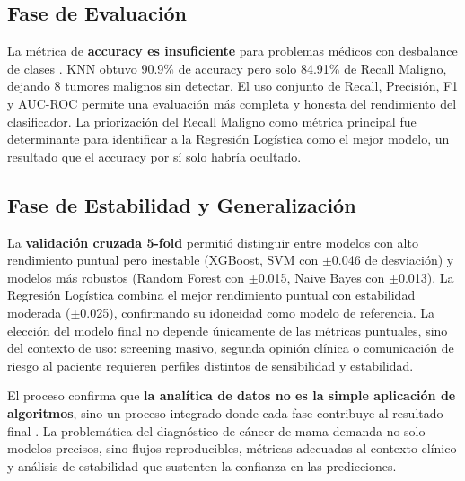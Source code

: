 \documentclass[journal]{IEEEtran}
\begin{document}
\subsection{Fase de Evaluación}
La métrica de \textbf{accuracy es insuficiente} para problemas médicos con desbalance de clases \cite{hossin2015, sokolova2009}. KNN obtuvo 90.9\% de accuracy pero solo 84.91\% de Recall Maligno, dejando 8 tumores malignos sin detectar. El uso conjunto de Recall, Precisión, F1 y AUC-ROC permite una evaluación más completa y honesta del rendimiento del clasificador. La priorización del Recall Maligno como métrica principal fue determinante para identificar a la Regresión Logística como el mejor modelo, un resultado que el accuracy por sí solo habría ocultado.

\subsection{Fase de Estabilidad y Generalización}
La \textbf{validación cruzada 5-fold} \cite{hastie2009} permitió distinguir entre modelos con alto rendimiento puntual pero inestable (XGBoost, SVM con $\pm$0.046 de desviación) y modelos más robustos (Random Forest con $\pm$0.015, Naive Bayes con $\pm$0.013). La Regresión Logística combina el mejor rendimiento puntual con estabilidad moderada ($\pm$0.025), confirmando su idoneidad como modelo de referencia. La elección del modelo final no depende únicamente de las métricas puntuales, sino del contexto de uso: screening masivo, segunda opinión clínica o comunicación de riesgo al paciente requieren perfiles distintos de sensibilidad y estabilidad.

El proceso confirma que \textbf{la analítica de datos no es la simple aplicación de algoritmos}, sino un proceso integrado donde cada fase contribuye al resultado final \cite{curso_ud}. La problemática del diagnóstico de cáncer de mama demanda no solo modelos precisos, sino flujos reproducibles, métricas adecuadas al contexto clínico y análisis de estabilidad que sustenten la confianza en las predicciones.
\end{document}
